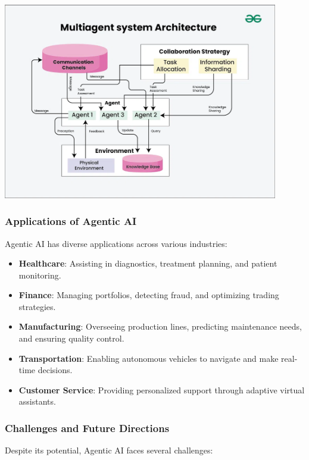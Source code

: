 \begin{center}
    \centering
    \includegraphics[width=0.9\textwidth]{Images/multi_agent_system.png}
     \cite{multiAgentSystem}
    \label{fig:multi_agent_system}
\end{center}

\subsubsection{Applications of Agentic AI}
Agentic AI has diverse applications across various industries:

\begin{itemize}
    \item \textbf{Healthcare}: Assisting in diagnostics, treatment planning, and patient monitoring.
    \item \textbf{Finance}: Managing portfolios, detecting fraud, and optimizing trading strategies.
    \item \textbf{Manufacturing}: Overseeing production lines, predicting maintenance needs, and ensuring quality control.
    \item \textbf{Transportation}: Enabling autonomous vehicles to navigate and make real-time decisions.
    \item \textbf{Customer Service}: Providing personalized support through adaptive virtual assistants.
\end{itemize}

\subsubsection{Challenges and Future Directions}
Despite its potential, Agentic AI faces several challenges:

